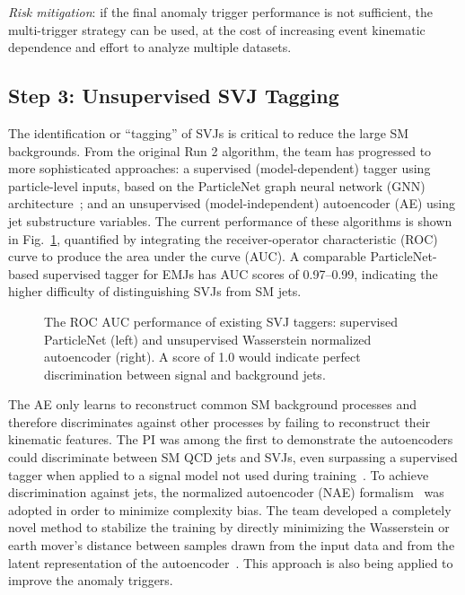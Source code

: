 \textit{Risk mitigation}: if the final anomaly trigger performance is not sufficient, the multi-trigger strategy can be used, at the cost of increasing event kinematic dependence and effort to analyze multiple datasets.

\subsection{Step 3: Unsupervised SVJ Tagging}\label{subsec:tagging}

The identification or ``tagging'' of SVJs is critical to reduce the large SM backgrounds.
From the original Run 2 algorithm, the team has progressed to more sophisticated approaches:
a supervised (model-dependent) tagger using particle-level inputs, based on the ParticleNet graph neural network (GNN) architecture~\cite{Qu:2019gqs};
and an unsupervised (model-independent) autoencoder (AE) using jet substructure variables.
The current performance of these algorithms is shown in Fig.~\ref{fig:svjtaggers}, quantified by integrating the receiver-operator characteristic (ROC) curve to produce the area under the curve (AUC).
A comparable ParticleNet-based supervised tagger for EMJs has AUC scores of 0.97--0.99, indicating the higher difficulty of distinguishing SVJs from SM jets.

\begin{figure}[htb!]
\centering
{}
\caption{The ROC AUC performance of existing SVJ taggers: supervised ParticleNet (left) and unsupervised Wasserstein normalized autoencoder (right).
A score of 1.0 would indicate perfect discrimination between signal and background jets.}
\label{fig:svjtaggers}
\end{figure}

The AE only learns to reconstruct common SM background processes and therefore discriminates against other processes by failing to reconstruct their kinematic features.
The PI was among the first to demonstrate the autoencoders could discriminate between SM QCD jets and SVJs, even surpassing a supervised tagger when applied to a signal model not used during training~\cite{Canelli:2021aps}.
To achieve discrimination against \ttbar jets, the normalized autoencoder (NAE) formalism~\cite{Dillon:2022mkq} was adopted in order to minimize complexity bias.
The team developed a completely novel method to stabilize the training by directly minimizing the Wasserstein or earth mover's distance
between samples drawn from the input data and from the latent representation of the autoencoder~\cite{Eble:2024tpr}.
This approach is also being applied to improve the anomaly triggers.

